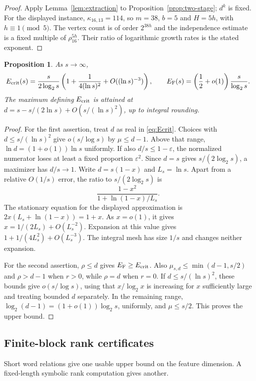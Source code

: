 \documentclass[11pt,a4paper]{article}
\newtheorem{proposition}[theorem]{Proposition}
\theoremstyle{definition}
\theoremstyle{remark}
\numberwithin{equation}{section}
\begin{document}
\begin{proof}
Apply Lemma~\ref{lem:extraction} to Proposition~\ref{prop:two-stage}; $d^k$ is fixed. For the displayed instance, $\kappa_{16,13}=114$, so $m=38$, $b=5$ and $H=5h$, with $h\equiv1\pmod5$. The vertex count is of order $2^{38h}$ and the independence estimate is a fixed multiple of $\rho_{16}^{5h}$. Their ratio of logarithmic growth rates is the stated exponent.
\end{proof}


\begin{proposition}\label{prop:asymptotic}
As $s\to\infty$,
\[
E_{\rm crit}(s)=\frac{s}{2\log_2s}\left(1+\frac{1}{4(\ln s)^2}+O((\ln s)^{-3})\right),
\qquad E_{\rm F}(s)=\left(\frac12+o(1)\right)\frac{s}{\log_2s}.
\]
The maximum defining $E_{\rm crit}$ is attained at
$d=s-s/(2\ln s)+O(s/(\ln s)^2)$, up to integral rounding.
\end{proposition}


\begin{proof}
For the first assertion, treat $d$ as real in \eqref{eq:Ecrit}. Choices with $d\le s/(\ln s)^2$ give $o(s/\log s)$ by $\mu\le d-1$. Above that range, $\ln d=(1+o(1))\ln s$ uniformly. If also $d/s\le1-\varepsilon$, the normalized numerator loses at least a fixed proportion $\varepsilon^2$. Since $d=s$ gives $s/(2\log_2s)$, a maximizer has $d/s\to1$. Write $d=s(1-x)$ and $L_s=\ln s$. Apart from a relative $O(1/s)$ error, the ratio to $s/(2\log_2s)$ is
\[
\frac{1-x^2}{1+\ln(1-x)/L_s}.
\]
The stationary equation for the displayed approximation is $2x(L_s+\ln(1-x))=1+x$. As $x=o(1)$, it gives $x=1/(2L_s)+O(L_s^{-2})$. Expansion at this value gives $1+1/(4L_s^2)+O(L_s^{-3})$. The integral mesh has size $1/s$ and changes neither expansion.

For the second assertion, $\rho\le d$ gives $E_{\rm F}\ge E_{\rm crit}$. Also $\mu_{s,d}\le\min(d-1,s/2)$ and $\rho>d-1$ when $r>0$, while $\rho=d$ when $r=0$. If $d\le s/(\ln s)^2$, these bounds give $o(s/\log s)$, using that $x/\log_2x$ is increasing for $x$ sufficiently large and treating bounded $d$ separately. In the remaining range, $\log_2(d-1)=(1+o(1))\log_2s$, uniformly, and $\mu\le s/2$. This proves the upper bound.
\end{proof}


\subsection{Finite-block rank certificates}\label{sec:finite-blocks}
Short word relations give one usable upper bound on the feature dimension. A fixed-length symbolic rank computation gives another.
\end{document}
